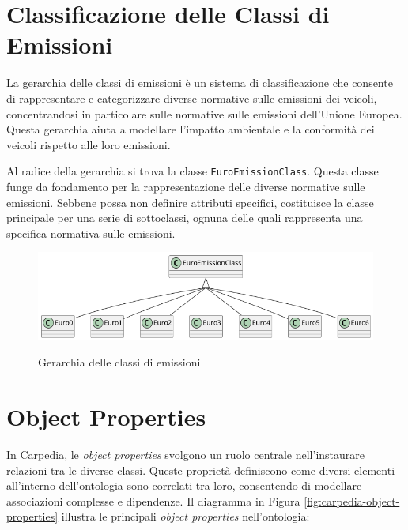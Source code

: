 \section{Classificazione delle Classi di Emissioni}

La gerarchia delle classi di emissioni è un sistema di classificazione che  consente di rappresentare e categorizzare diverse normative sulle emissioni dei veicoli, concentrandosi in particolare sulle normative sulle emissioni dell'Unione Europea. Questa gerarchia aiuta a modellare l'impatto ambientale e la conformità dei veicoli rispetto alle loro emissioni.

Al radice della gerarchia si trova la classe \texttt{EuroEmissionClass}. Questa classe funge da fondamento per la rappresentazione delle diverse normative sulle emissioni. Sebbene possa non definire attributi specifici, costituisce la classe principale per una serie di sottoclassi, ognuna delle quali rappresenta una specifica normativa sulle emissioni.

\begin{figure}[H]
    \caption{Gerarchia delle classi di emissioni}
    \includegraphics[width=\textwidth]{figures/carpedia-euro-emission.png}
    \label{fig:carpedia-euro-emission}
\end{figure}

\section{Object Properties}

In Carpedia, le \textit{object properties} svolgono un ruolo centrale nell'instaurare relazioni tra le diverse classi. Queste proprietà definiscono come diversi elementi all'interno dell'ontologia sono correlati tra loro, consentendo di modellare associazioni complesse e dipendenze. Il diagramma in Figura \ref{fig:carpedia-object-properties} illustra le principali \textit{object properties} nell'ontologia:

